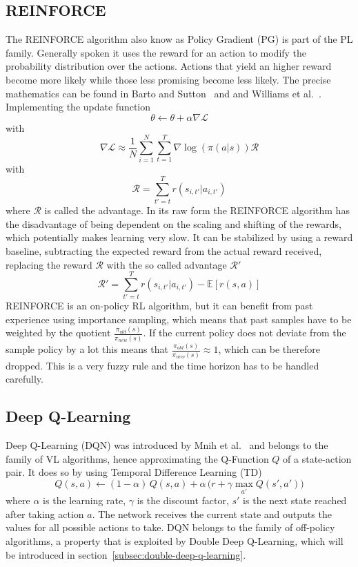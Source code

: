 \documentclass[11pt,a4paper]{article}
\begin{document}
	\subsection{REINFORCE}\label{subsec:policy-gradient}
	The REINFORCE algorithm also know as Policy Gradient (PG) is part of the PL family.
	Generally spoken it uses the reward for an action to modify the probability distribution over the actions.
	Actions that yield an higher reward become more likely while those less promising become less likely.
	The precise mathematics can be found in Barto and Sutton~\cite{sutton_introduction_1998} and and Williams et al.~\cite{williams_simple_1992}.
	Implementing the update function
	\[\theta \leftarrow \theta + \alpha \nabla \mathcal{L}\]
	with
	\[\nabla \mathcal{L} \approx \frac{1}{N} \sum^N_{i=1} \sum^T_{t=1} \nabla \log(\pi(a|s))\mathcal{R}\]
	with
	\[ \mathcal{R} = \sum_{t'=t}^T r(s_{i, t'}|a_{i, t'}) \]
	where $\mathcal{R}$ is called the advantage.
	In its raw form the REINFORCE algorithm has the disadvantage of being dependent on the scaling and shifting of the rewards, which potentially makes learning very slow.
	It can be stabilized by using a reward baseline, subtracting the expected reward from the actual reward received, replacing the reward $\mathcal{R}$ with the so called advantage $\mathcal{R}'$
	\begin{equation}\label{eq:advantage}
		\mathcal{R}' = \sum_{t'=t}^T r(s_{i, t'}|a_{i, t'}) - \mathbb{E}[r(s, a)]
	\end{equation}
	REINFORCE is an on-policy RL algorithm, but it can benefit from past experience using importance sampling, which means that past samples have to be weighted by the quotient $\frac{\pi_{old}(s)}{\pi_{new}(s)}$.
	If the current policy does not deviate from the sample policy by a lot this means that $\frac{\pi_{old}(s)}{\pi_{new}(s)} \approx 1$, which can be therefore dropped.
	This is a very fuzzy rule and the time horizon has to be handled carefully.

	\subsection{Deep Q-Learning}\label{subsec:deep-q-learning}
	Deep Q-Learning (DQN) was introduced by Mnih et al.~\cite{mnih_human-level_2015} and belongs to the family of VL algorithms, hence approximating the Q-Function $Q$ of a state-action pair.
	It does so by using Temporal Difference Learning (TD)
	\[Q(s,a) \leftarrow (1-\alpha)\, Q(s,a) + \alpha\,\Big(r + \gamma \max_{a'}Q(s', a')\Big)\]
	where $\alpha$ is the learning rate, $\gamma$ is the discount factor, $s'$ is the next state reached after taking action $a$.
	The network receives the current state and outputs the values for all possible actions to take.
	DQN belongs to the family of off-policy algorithms, a property that is exploited by Double Deep Q-Learning, which will be introduced in section~\ref{subsec:double-deep-q-learning}.
	
\end{document}
